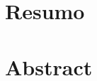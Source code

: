 
\chapter*{Resumo}

\begin{comment}
Elemento obrigatório, constituído de uma sequência de frases concisas e
objetivas, em forma de texto.  Deve apresentar os objetivos, métodos empregados,
resultados e conclusões.  O resumo deve ser redigido em parágrafo único, conter
no máximo 500 palavras e ser seguido dos termos representativos do conteúdo do
trabalho (palavras-chave).
\\

\noindent \textbf{Palavras-chave:} palavra-chave1, palavra-chave2, palavra-chave3.
\end{comment}


\chapter*{Abstract}

\begin{comment}
Elemento obrigatório, elaborado com as mesmas características do resumo em
língua portuguesa.
\\

\noindent \textbf{Keywords:} keyword1, keyword2, keyword3.
\end{comment}
